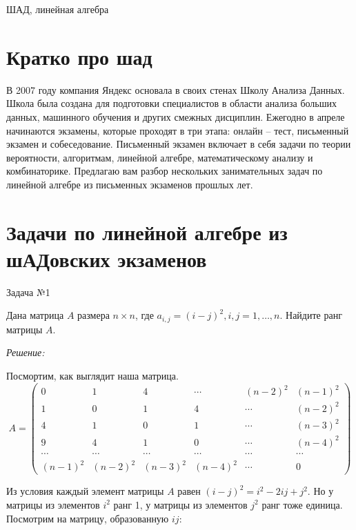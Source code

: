 \documentclass[10pt]{article}
\begin{document}


\DoFirstPageTechnicalStuff

\begin{abstract}
\end{abstract}

\begin{keyword}
ШАД, линейная алгебра
\end{keyword}

\section{Кратко про шад}

В 2007 году компания Яндекс основала в своих стенах Школу Анализа Данных. Школа была создана для подготовки специалистов в области анализа больших данных, машинного обучения и других смежных дисциплин. Ежегодно в апреле начинаются экзамены, которые проходят в три этапа: онлайн -- тест, письменный экзамен и собеседование. Письменный экзамен включает в себя задачи по теории вероятности, алгоритмам, линейной алгебре, математическому анализу и комбинаторике. Предлагаю вам разбор нескольких занимательных задач по линейной алгебре из письменных экзаменов прошлых лет.

\section{Задачи по линейной алгебре из шАДовских экзаменов}

Задача №1

Дана матрица $A$ размера $n \times n$, где $a_{i,j} = (i-j)^2, i,j = 1,\ldots ,n$. Найдите ранг матрицы $A$.

\textit{Решение:}

Посмортим, как выглядит наша матрица.
\[
A = \begin{pmatrix}
0 & 1 & 4 & \cdots & (n-2)^2 & (n-1)^2 \\
1 & 0 & 1 & 4 & \cdots & (n-2)^2 \\
4 & 1 & 0 & 1 & \cdots & (n-3)^2 \\
9 & 4 & 1 & 0 & \cdots & (n-4)^2 \\
\cdots & \cdots & \cdots & \cdots & \cdots & \cdots \\
(n-1)^2 & (n-2)^2 & (n-3)^2 & (n-4)^2 & \cdots & 0
\end{pmatrix}
\]

Из условия каждый элемент матрицы $A$ равен $(i-j)^2 = i^2 - 2ij + j^2$. Но у матрицы из элементов $i^2$ ранг 1, у матрицы из элементов $j^2$ ранг тоже единица. Посмотрим на матрицу, образованную $ij$:
\end{document}
